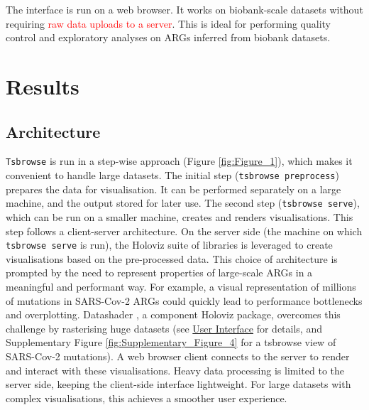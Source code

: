 \documentclass[unnumsec,webpdf,contemporary,large,namedate]{oup-authoring-template}%
\begin{document}
The interface is run on a web browser. It works on biobank-scale datasets
without requiring \textcolor{red}{raw data uploads to a server}. This is ideal
for performing quality control and exploratory analyses on ARGs inferred from
biobank datasets. \section{Results} \subsection{Architecture} \texttt{Tsbrowse}
is run in a step-wise approach (Figure \ref{fig:Figure_1}), which makes it
convenient to handle large datasets. The initial step (\texttt{tsbrowse
preprocess}) prepares the data for visualisation. It can be performed
separately on a large machine, and the output stored for later use. The second
step (\texttt{tsbrowse serve}), which can be run on a smaller machine, creates
and renders visualisations. This step follows a client-server architecture. On
the server side (the machine on which \texttt{tsbrowse serve} is run), the
Holoviz suite of libraries \citep{Holoviz} is leveraged to create
visualisations based on the pre-processed data. This choice of architecture is
prompted by the need to represent properties of large-scale ARGs in a
meaningful and performant way. For example, a visual representation of millions
of mutations in SARS-Cov-2 ARGs \citep{zhan2023towards} could quickly
lead to performance bottlenecks and overplotting. Datashader
\citep{Datashader}, a component Holoviz package, overcomes this challenge by
rasterising huge datasets (see \hyperref[subsec:User_Interface]{User Interface}
for details, and Supplementary Figure \ref{fig:Supplementary_Figure_4} for a
tsbrowse view of SARS-Cov-2 mutations). A web browser client connects to the
server to render and interact with these visualisations. Heavy data processing
is limited to the server side, keeping the client-side interface lightweight.
For large datasets with complex visualisations, this achieves a smoother user
experience.
\end{document}
